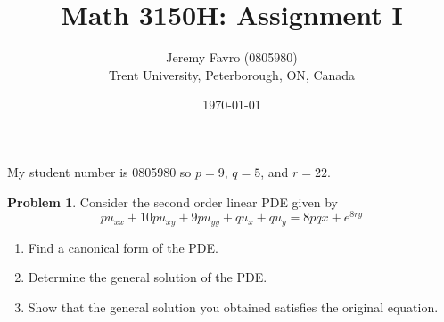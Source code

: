 \documentclass[10pt]{article}
\title{Math 3150H: Assignment I}
\author{Jeremy Favro (0805980) \\ Trent University, Peterborough, ON, Canada}
\date{\today}
\theoremstyle{definition}
\newtheorem{problem}{Problem}
\begin{document}
\maketitle
My student number is 0805980 so $p=9$, $q=5$, and $r=22$.
\begin{problem}
Consider the second order linear PDE given by
$$pu_{xx}+10pu_{xy}+9pu_{yy}+qu_x+qu_y=8pqx+e^{8ry}$$
\begin{enumerate}[label=(\alph*)]
  \item Find a canonical form of the PDE.
  \item Determine the general solution of the PDE.
  \item Show that the general solution you obtained satisfies the original equation.
\end{enumerate}
\end{problem}
\end{document}
